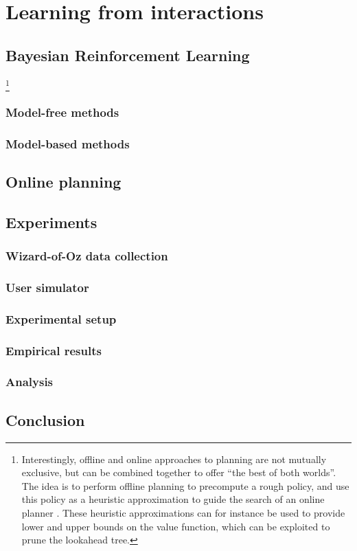 \chapter{Learning from interactions}
\label{chap:rllearning}

\section{Bayesian Reinforcement Learning}

\footnote{Interestingly, offline and online approaches to planning are not mutually exclusive, but can be combined together to offer ``the best of both worlds''.  The idea is to perform offline planning to precompute a rough policy, and use this policy as a heuristic approximation to guide the search of an online planner \citep{ross2008}. These heuristic approximations can for instance be used to provide lower and upper bounds on the value function, which can be exploited to prune the lookahead tree.}

\subsection{Model-free methods}

\subsection{Model-based methods}

\section{Online planning}

\section{Experiments}

\label{sec:rllearning-experiments}

\subsection{Wizard-of-Oz data collection}

\subsection{User simulator}

\subsection{Experimental setup}

\subsection{Empirical results}

\subsection{Analysis}

\section{Conclusion}